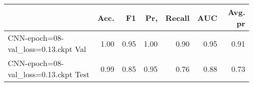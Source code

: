 \begin{tabular}{lrrrrrr}
\toprule
{} &  Acc. &    F1 &   Pr, &  Recall &   AUC &  Avg. pr \\
\midrule
CNN-epoch=08-val\_loss=0.13.ckpt Val  &  1.00 &  0.95 &  1.00 &    0.90 &  0.95 &     0.91 \\
CNN-epoch=08-val\_loss=0.13.ckpt Test &  0.99 &  0.85 &  0.95 &    0.76 &  0.88 &     0.73 \\
\bottomrule
\end{tabular}
